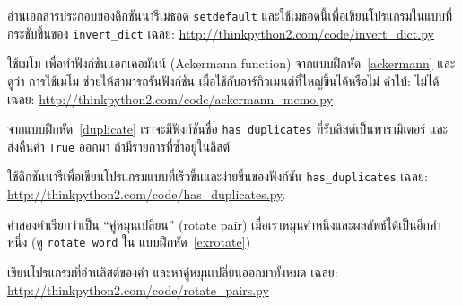 \begin{exercise}
\label{setdefault}

อ่านเอกสารประกอบของดิกชันนารีเมธอด \texttt{setdefault}
และใช้เมธอดนี้เพื่อเขียนโปรแกรมในแบบที่กระชับขึ้นของ \verb|invert_dict|
เฉลย: \url{http://thinkpython2.com/code/invert_dict.py}

\end{exercise}
\vspace{0.5cm}


\begin{exercise}
ใช้เมโม เพื่อทำฟังก์ชันแอกเคอมันน์ (Ackermann function) จากแบบฝึกหัด~\ref{ackermann} 
และดูว่า การใช้เมโม ช่วยให้สามารถรันฟังก์ชัน เมื่อใช้กับอาร์กิวเมนต์ที่ใหญ่ขึ้นได้หรือไม่  
คำใบ้: ไม่ได้
เฉลย: \url{http://thinkpython2.com/code/ackermann_memo.py}

\end{exercise}
\vspace{0.5cm}



\begin{exercise}

จากแบบฝึกหัด~\ref{duplicate} เราจะมีฟังก์ชันชื่อ \verb|has_duplicates| ที่รับลิสต์เป็นพารามิเตอร์ และส่งคืนค่า \texttt{True} ออกมา ถ้ามีรายการที่ซ้ำอยู่ในลิสต์

ใช้ดิกชันนารีเพื่อเขียนโปรแกรมแบบที่เร็วขึ้นและง่ายขึ้นของฟังก์ชัน
\verb|has_duplicates| 
เฉลย: \url{http://thinkpython2.com/code/has_duplicates.py}.

\end{exercise}
\vspace{0.5cm}


\begin{exercise}
\label{exrotatepairs}

คำสองคำเรียกว่าเป็น ``คู่หมุนเปลี่ยน'' (rotate pair) 
เมื่อเราหมุนคำหนึ่งและผลลัพธ์ได้เป็นอีกคำหนึ่ง (ดู \verb|rotate_word| ใน แบบฝึกหัด~\ref{exrotate})

เขียนโปรแกรมที่อ่านลิสต์ของคำ และหาคู่หมุนเปลี่ยนออกมาทั้งหมด
เฉลย: \url{http://thinkpython2.com/code/rotate_pairs.py}

\end{exercise}
\vspace{0.5cm}


